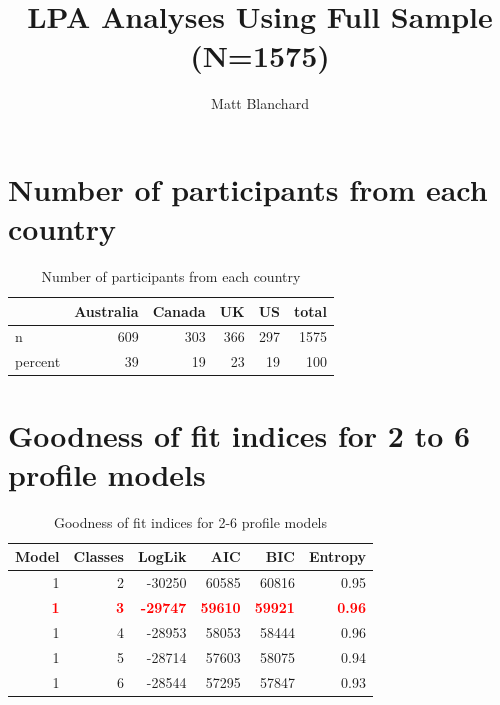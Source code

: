 \documentclass[]{article}
\title{LPA Analyses Using Full Sample (N=1575)}
\author{Matt Blanchard}
\date{}
\begin{document}
\maketitle

\hypertarget{number-of-participants-from-each-country}{%
\section{Number of participants from each
country}\label{number-of-participants-from-each-country}}

\begin{table}[H]

\caption{\label{tab:unnamed-chunk-2}Number of participants from each country}
\centering
\fontsize{6}{8}\selectfont
\begin{tabular}[t]{lrrrrr}
\toprule
  & Australia & Canada & UK & US & total\\
\midrule
n & 609 & 303 & 366 & 297 & 1575\\
percent & 39 & 19 & 23 & 19 & 100\\
\bottomrule
\end{tabular}
\end{table}

\hypertarget{goodness-of-fit-indices-for-2-to-6-profile-models}{%
\section{Goodness of fit indices for 2 to 6 profile
models}\label{goodness-of-fit-indices-for-2-to-6-profile-models}}

\begin{table}[H]

\caption{\label{tab:unnamed-chunk-3}Goodness of fit indices for 2-6 profile models}
\centering
\fontsize{6}{8}\selectfont
\begin{tabular}[t]{rrrrrr}
\toprule
Model & Classes & LogLik & AIC & BIC & Entropy\\
\midrule
1 & 2 & -30250 & 60585 & 60816 & 0.95\\
\textcolor{red}{\textbf{1}} & \textcolor{red}{\textbf{3}} & \textcolor{red}{\textbf{-29747}} & \textcolor{red}{\textbf{59610}} & \textcolor{red}{\textbf{59921}} & \textcolor{red}{\textbf{0.96}}\\
1 & 4 & -28953 & 58053 & 58444 & 0.96\\
1 & 5 & -28714 & 57603 & 58075 & 0.94\\
1 & 6 & -28544 & 57295 & 57847 & 0.93\\
\bottomrule
\end{tabular}
\end{table}
\end{document}
